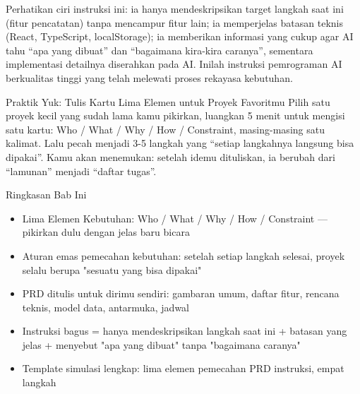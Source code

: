 Perhatikan ciri instruksi ini: ia hanya mendeskripsikan target langkah saat ini (fitur pencatatan) tanpa mencampur fitur lain; ia memperjelas batasan teknis (React, TypeScript, localStorage); ia memberikan informasi yang cukup agar AI tahu “apa yang dibuat” dan “bagaimana kira-kira caranya”, sementara implementasi detailnya diserahkan pada AI. Inilah instruksi pemrograman AI berkualitas tinggi yang telah melewati proses rekayasa kebutuhan.

\begin{tcbpractice}{Praktik Yuk: Tulis Kartu Lima Elemen untuk Proyek Favoritmu}
Pilih satu proyek kecil yang sudah lama kamu pikirkan, luangkan 5 menit untuk mengisi satu kartu: Who / What / Why / How / Constraint, masing-masing satu kalimat. Lalu pecah menjadi 3-5 langkah yang “setiap langkahnya langsung bisa dipakai”. Kamu akan menemukan: setelah idemu dituliskan, ia berubah dari “lamunan” menjadi “daftar tugas”.

\end{tcbpractice}

\begin{tcbsummary}{Ringkasan Bab Ini}
\begin{itemize}
  \item Lima Elemen Kebutuhan: Who / What / Why / How / Constraint — pikirkan dulu dengan jelas baru bicara
  \item Aturan emas pemecahan kebutuhan: setelah setiap langkah selesai, proyek selalu berupa "sesuatu yang bisa dipakai"
  \item PRD ditulis untuk dirimu sendiri: gambaran umum, daftar fitur, rencana teknis, model data, antarmuka, jadwal
  \item Instruksi bagus = hanya mendeskripsikan langkah saat ini + batasan yang jelas + menyebut "apa yang dibuat" tanpa "bagaimana caranya"
  \item Template simulasi lengkap: lima elemen pemecahan PRD instruksi, empat langkah
\end{itemize}

\end{tcbsummary}

